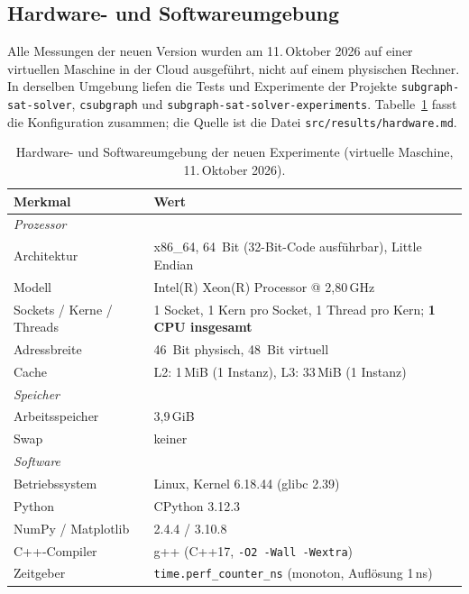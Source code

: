 \documentclass[a4paper,12pt]{article}
\theoremstyle{definition}
\begin{document}
\subsection{Hardware- und Softwareumgebung}
\label{sec:v2-hardware}

Alle Messungen der neuen Version wurden am 11.\,Oktober 2026 auf einer virtuellen Maschine in der Cloud ausgeführt, nicht auf einem physischen Rechner. In derselben Umgebung liefen die Tests und Experimente der Projekte \texttt{subgraph-sat-solver}, \texttt{csubgraph} und \texttt{subgraph-sat-solver-experiments}. Tabelle~\ref{tab:v2-hardware} fasst die Konfiguration zusammen; die Quelle ist die Datei \texttt{src/results/hardware.md}.

\begin{table}[ht]
\centering\small
\renewcommand{\arraystretch}{1.1}
\begin{tabular}{p{4.2cm}p{10.2cm}}
\toprule
Merkmal & Wert \\
\midrule
\multicolumn{2}{l}{\textit{Prozessor}} \\
Architektur & x86\_64, 64~Bit (32-Bit-Code ausführbar), Little Endian \\
Modell & Intel(R) Xeon(R) Processor @ 2,80\,GHz \\
Sockets / Kerne / Threads & 1 Socket, 1 Kern pro Socket, 1 Thread pro Kern; \textbf{1 CPU insgesamt} \\
Adressbreite & 46~Bit physisch, 48~Bit virtuell \\
Cache & L2: 1\,MiB (1 Instanz), L3: 33\,MiB (1 Instanz) \\
\midrule
\multicolumn{2}{l}{\textit{Speicher}} \\
Arbeitsspeicher & 3,9\,GiB \\
Swap & keiner \\
\midrule
\multicolumn{2}{l}{\textit{Software}} \\
Betriebssystem & Linux, Kernel 6.18.44 (glibc 2.39) \\
Python & CPython 3.12.3 \\
NumPy / Matplotlib & 2.4.4 / 3.10.8 \\
C++-Compiler & g++ (C++17, \texttt{-O2 -Wall -Wextra}) \\
Zeitgeber & \texttt{time.perf\_counter\_ns} (monoton, Auflösung 1\,ns) \\
\bottomrule
\end{tabular}
\caption{Hardware- und Softwareumgebung der neuen Experimente (virtuelle Maschine, 11.\,Oktober 2026).}
\label{tab:v2-hardware}
\end{table}
\end{document}

